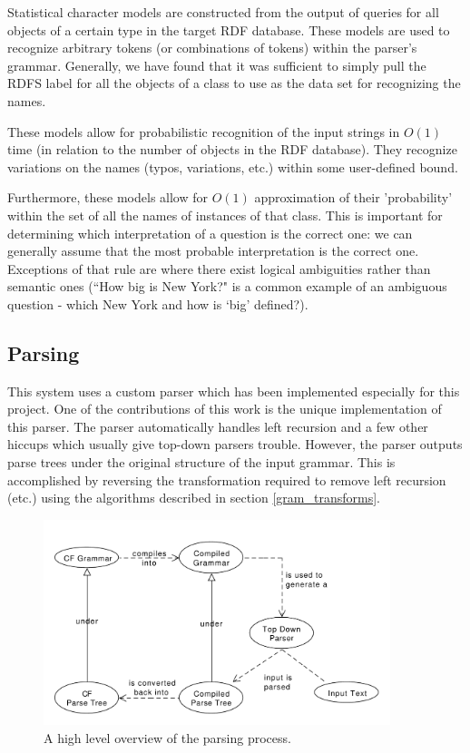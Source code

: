 \documentclass[11pt]{article}
\begin{document}
Statistical character models are constructed from the output of queries for all 
objects of a certain type in the target RDF database. 
These models are used to recognize arbitrary tokens (or combinations of 
tokens) within the parser's grammar. Generally, we have found that it was sufficient
to simply pull the RDFS label for all the objects of a class to use as the data
set for recognizing the names.

These models allow for probabilistic recognition of the input strings in 
$O(1)$ time (in relation to the number of objects in the RDF
database). They recognize variations on the names (typos, variations, etc.)
within some user-defined bound. 

Furthermore, these models allow for $O(1)$
approximation of their 'probability' within the set of all the names of instances
of that class. This is important for determining which interpretation of a
question is the correct one: we can generally assume that the most probable
interpretation is the correct one. Exceptions of that rule are where there exist
logical ambiguities rather than semantic ones (``How big is New York?" is a common example
of an ambiguous question - which New York and how is `big' defined?).

\subsection{Parsing}

This system uses a custom parser which has been implemented especially for
this project. One of the contributions of this work is the unique implementation
of this parser. The parser automatically handles left recursion and a few other
hiccups which usually give top-down parsers trouble. However, the parser outputs
parse trees under the original structure of the input grammar.
This is accomplished by reversing the transformation required to remove left
recursion (etc.) using the algorithms described in section \ref{gram_transforms}.

\begin{figure}[h!]
    \centering
    \includegraphics[width=0.9\textwidth,natwidth=1,natheight=1]{umlet/high_level.pdf}
    \caption{A high level overview of the parsing process.}
    \label{fig:high_level_parse}
\end{figure}
\end{document}
